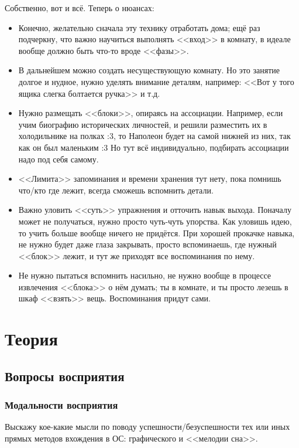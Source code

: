 \documentclass[a4paper,14pt,oneside]{memoir}
\begin{document}
Собственно, вот и всё. Теперь о нюансах:
\begin{itemize}
\item Конечно, желательно сначала эту технику отработать дома; ещё раз подчеркну, что важно научиться выполнять <<вход>> в комнату, в идеале вообще должно быть что-то вроде <<фазы>>. 
\item В дальнейшем можно создать несуществующую комнату. Но это занятие долгое и нудное, нужно уделять внимание деталям, например: <<Вот у того ящика слегка болтается ручка>> и т.д. 
\item Нужно размещать <<блоки>>, опираясь на ассоциации. Например, если учим биографию исторических личностей, и решили разместить их в холодильнике на полках :3, то Наполеон будет на самой нижней из них, так как он был маленьким :3 Но тут всё индивидуально, подбирать ассоциации надо под себя самому. 
\item <<Лимита>> запоминания и времени хранения тут нету, пока помнишь что/кто где лежит, всегда сможешь вспомнить детали. 
\item Важно уловить <<суть>> упражнения и отточить навык выхода. Поначалу может не получаться, нужно просто чуть-чуть упорства. Как уловишь идею, то учить больше вообще ничего не придётся. При хорошей прокачке навыка, не нужно будет даже глаза закрывать, просто вспоминаешь, где нужный <<блок>> лежит, и тут же приходят все воспоминания по нему. 
\item Не нужно пытаться вспомнить насильно, не нужно вообще в процессе извлечения <<блока>> о нём думать; ты в комнате, и ты просто лезешь в шкаф <<взять>> вещь. Воспоминания придут сами.
\end{itemize}



\part{ Теория}


\chapter{Вопросы восприятия}




\section{Модальности восприятия}
Выскажу кое-какие мысли по поводу успешности/без\-ус\-пеш\-нос\-ти тех или иных прямых методов вхождения в ОС: графического и <<мелодии сна>>.
\end{document}
